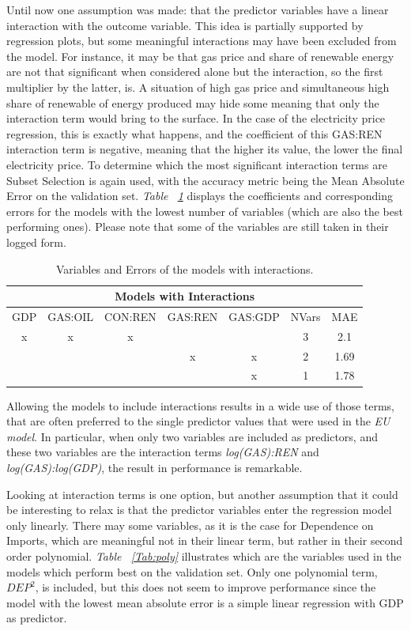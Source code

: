\documentclass[a4paper,12pt]{book}
\begin{document}
Until now one assumption was made: that the predictor variables have a linear interaction with the outcome variable. This idea is partially supported by regression plots, but some meaningful interactions may have been excluded from the model. For instance, it may be that gas price and share of renewable energy are not that significant when considered alone but the interaction, so the first multiplier by the latter, is. A situation of high gas price and simultaneous high share of renewable of energy produced may hide some meaning that only the interaction term would bring to the surface. In the case of the electricity price regression, this is exactly what happens, and the coefficient of this GAS:REN interaction term is negative, meaning that the higher its value, the lower the final electricity price. To determine which the most significant interaction terms are Subset Selection is again used, with the accuracy metric being the Mean Absolute Error on the validation set. \textit{Table ~\ref{Tab:int}} displays the coefficients and corresponding errors for the models with the lowest number of variables (which are also the best performing ones). Please note that some of the variables are still taken in their logged form.

\begin{table}[tb]
\begin{center}
\begin{tabular}{|c|c|c|c|c|c|c|}
\hline
\multicolumn{7}{|c|}{Models with Interactions}\\
\hline
GDP&GAS:OIL&CON:REN&GAS:REN&GAS:GDP&NVars&MAE\\
\hline
x&x&x&&&3&2.1\\
&&&x&x&2&1.69\\
&&&&x&1&1.78\\
\hline
\end{tabular}
\caption{Variables and Errors of the models with interactions.}
\label{Tab:int}
\end{center}
\end{table}

Allowing the models to include interactions results in a wide use of those terms, that are often preferred to the single predictor values that were used in the \textit{EU model}. In particular, when only two variables are included as predictors, and these two variables are the interaction terms \textit{log(GAS):REN} and \textit{log(GAS):log(GDP)}, the result in performance is remarkable.

Looking at interaction terms is one option, but another assumption that it could be interesting to relax is that the predictor variables enter the regression model only linearly. There may some variables, as it is the case for Dependence on Imports, which are meaningful not in their linear term, but rather in their second order polynomial. \textit{Table ~\ref{Tab:poly}} illustrates which are the variables used in the models which perform best on the validation set. Only one polynomial term, $DEP^2$, is included, but this does not seem to improve performance since the model with the lowest mean absolute error is a simple linear regression with GDP as predictor.
\end{document}
